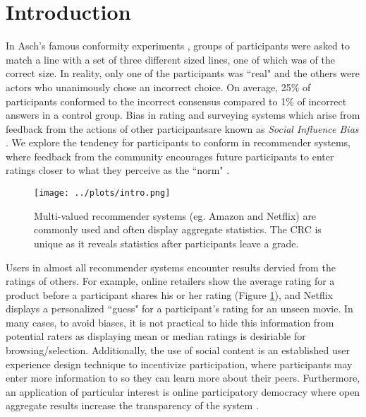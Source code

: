 \section{Introduction}
In Asch's famous conformity experiments \cite{asch1956studies, asch1955opinions, bond1996culture}, groups of participants were asked to match a line with a set of three different sized lines, one of which was of the correct size.
In reality, only one of the participants was ``real" and the others were actors who unanimously chose an incorrect choice.
On average, 25\% of participants conformed to the incorrect consensus compared to 1\% of incorrect answers in a control group.
Bias in rating and surveying systems which arise from feedback from the actions of other participantsare known as \emph{Social Influence Bias} \cite{demarzo2003persuasion, moscovici1972social, wood2000attitude}.
We explore the tendency for participants to conform in recommender systems, where feedback from the community encourages future participants to enter ratings closer to what they perceive as the ``norm" \cite{banerjee1992simple}.

\begin{figure}[t]
  \centering
    \texttt{[image: ../plots/intro.png]}
      \caption{Multi-valued recommender systems (eg. Amazon and Netflix) are commonly used and often display aggregate statistics. The CRC is unique as it reveals statistics after participants leave a grade.}
      \label{grading-0}
\end{figure}

Users in almost all recommender systems encounter results dervied from the ratings of others.
For example, online retailers show the average rating for a product before a participant shares his or her rating (Figure \ref{grading-0}), and Netflix displays a personalized ``guess" for a participant's rating for an unseen movie.
In many cases, to avoid biases, it is not practical to hide this information from potential raters as displaying mean or median ratings is desiriable for browsing/selection.
Additionally, the use of social content is an established user experience design technique to incentivize participation\cite{jian2012incentive, shneiderman1992designing}, where participants may enter more information to so they can learn more about their peers.
Furthermore, an application of particular interest is online participatory democracy where open aggregate results increase the transparency of the system \cite{albors2008new,o2012transparency,noveck2008wiki}.

